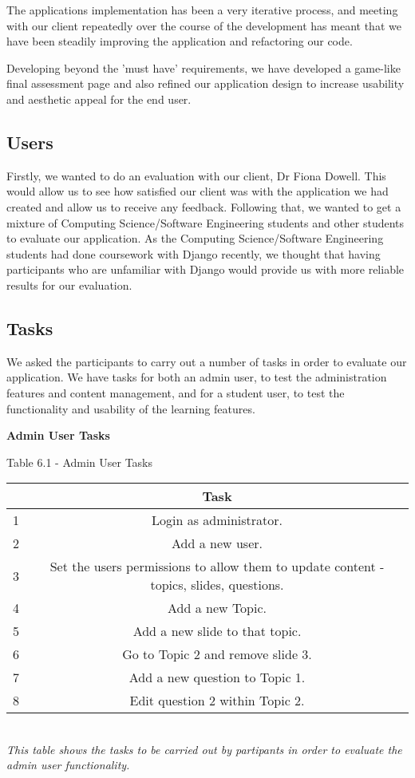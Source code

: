 \documentclass{l3proj}
\begin{document}
The applications implementation has been a very iterative process, and meeting with our client repeatedly over the course of the development has meant that we have been steadily improving the application and refactoring our code.

Developing beyond the 'must have' requirements, we have developed a game-like final assessment page and also refined our application design to increase usability and aesthetic appeal for the end user.


\subsection{Users}

Firstly, we wanted to do an evaluation with our client, Dr Fiona Dowell. This would allow us to see how satisfied our client was with the application we had created and allow us to receive any feedback. Following that, we wanted to get a mixture of Computing Science/Software Engineering students and other students to evaluate our application. As the Computing Science/Software Engineering students had done coursework with Django recently, we thought that having participants who are unfamiliar with Django would provide us with more reliable results for our evaluation.

\subsection{Tasks}

We asked the participants to carry out a number of tasks in order to evaluate our application. We have tasks for both an admin user, to test the administration features and content management, and for a student user, to test the functionality and usability of the learning features.
\newpage

\textbf{Admin User Tasks}

\begin{center}
Table 6.1 - Admin User Tasks
\begin{tabular}{|c|c|}
\hline & \textbf{Task}\\
\hline
\hline 1 & Login as administrator.\\
\hline 2 & Add a new user.\\
\hline 3 & Set the users permissions to allow them to update content - topics, slides, questions.\\
\hline 4 & Add a new Topic.\\
\hline 5 & Add a new slide to that topic.\\
\hline 6 & Go to Topic 2 and remove slide 3.\\
\hline 7 & Add a new question to Topic 1.\\
\hline 8 & Edit question 2 within Topic 2.\\
\hline
\end{tabular}\\
\textit{{\small This table shows the tasks to be carried out by partipants in order to evaluate the admin user functionality.}}
\end{center}
\end{document}
